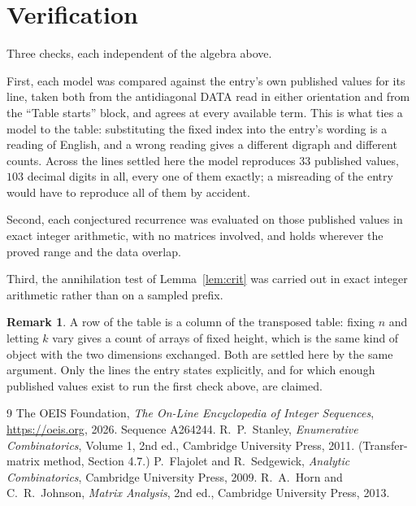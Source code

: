 \documentclass[11pt,a4paper]{article}
\theoremstyle{plain}
\theoremstyle{definition}
\newtheorem{remark}[theorem]{Remark}
\begin{document}
\section{Verification}

Three checks, each independent of the algebra above.

First, each model was compared against the entry's own published values for its line, taken
both from the antidiagonal DATA read in either orientation and from the ``Table starts''
block, and agrees at every available term. This is what ties a model to the table:
substituting the fixed index into the entry's wording is a reading of English, and a wrong
reading gives a different digraph and different counts. Across the lines settled here the
model reproduces $33$ published values, $103$ decimal digits in all, every one of
them exactly; a misreading of the entry would have to reproduce all of them by accident.

Second, each conjectured recurrence was evaluated on those published values in exact
integer arithmetic, with no matrices involved, and holds wherever the proved range and the
data overlap.

Third, the annihilation test of Lemma~\ref{lem:crit} was carried out in exact integer
arithmetic rather than on a sampled prefix.

\begin{remark}
A row of the table is a column of the transposed table: fixing $n$ and letting $k$ vary gives a
count of arrays of fixed height, which is the same kind of object with the two dimensions
exchanged. Both are settled here by the same argument. Only the lines the entry states
explicitly, and for which enough published values exist to run the first check above, are
claimed.
\end{remark}

\begin{thebibliography}{9}
 The OEIS Foundation, \emph{The On-Line Encyclopedia of Integer
Sequences}, \url{https://oeis.org}, 2026. Sequence A264244.
 R.~P.~Stanley, \emph{Enumerative Combinatorics}, Volume 1, 2nd ed.,
Cambridge University Press, 2011. (Transfer-matrix method, Section 4.7.)
 P.~Flajolet and R.~Sedgewick, \emph{Analytic Combinatorics}, Cambridge
University Press, 2009.
 R.~A.~Horn and C.~R.~Johnson, \emph{Matrix Analysis}, 2nd ed., Cambridge
University Press, 2013.
\end{thebibliography}
\end{document}
